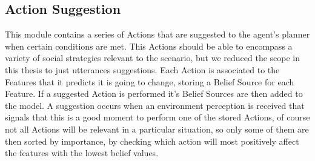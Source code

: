 \subsection{Action Suggestion}
\label{subsec:ActionSuggestion}
This module contains a series of Actions that are suggested to the agent's planner when certain conditions are met. This Actions should be able to encompass a variety of social strategies relevant to the scenario, but we reduced the scope in this thesis to just utterances suggestions. Each Action is associated to the Features that it predicts it is going to change, storing a Belief Source for each Feature. If a suggested Action is performed it's Belief Sources are then added to the model. A suggestion occurs when an environment perception is received that signals that this is a good moment to perform one of the stored Actions, of course not all Actions will be relevant in a particular situation, so only some of them are then sorted by importance, by checking which action will most positively affect the features with the lowest belief values.


